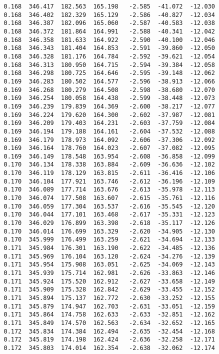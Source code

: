 \begin{verbatim}
   0.168  346.417  182.563  165.198   -2.585  -41.072  -12.030
   0.168  346.402  182.329  165.129   -2.586  -40.827  -12.034
   0.168  346.387  182.096  165.060   -2.587  -40.583  -12.038
   0.168  346.372  181.864  164.991   -2.588  -40.341  -12.042
   0.168  346.358  181.633  164.922   -2.590  -40.100  -12.046
   0.168  346.343  181.404  164.853   -2.591  -39.860  -12.050
   0.168  346.328  181.176  164.784   -2.592  -39.621  -12.054
   0.168  346.313  180.950  164.715   -2.594  -39.384  -12.058
   0.168  346.298  180.725  164.646   -2.595  -39.148  -12.062
   0.169  346.283  180.502  164.577   -2.596  -38.913  -12.066
   0.169  346.268  180.279  164.508   -2.598  -38.680  -12.070
   0.169  346.254  180.058  164.438   -2.599  -38.448  -12.073
   0.169  346.239  179.839  164.369   -2.600  -38.217  -12.077
   0.169  346.224  179.620  164.300   -2.602  -37.987  -12.081
   0.169  346.209  179.403  164.231   -2.603  -37.759  -12.084
   0.169  346.194  179.188  164.161   -2.604  -37.532  -12.088
   0.169  346.179  178.973  164.092   -2.606  -37.306  -12.092
   0.169  346.164  178.760  164.023   -2.607  -37.082  -12.095
   0.169  346.149  178.548  163.954   -2.608  -36.858  -12.099
   0.170  346.134  178.338  163.884   -2.609  -36.636  -12.102
   0.170  346.119  178.129  163.815   -2.611  -36.416  -12.106
   0.170  346.104  177.921  163.746   -2.612  -36.196  -12.109
   0.170  346.089  177.714  163.676   -2.613  -35.978  -12.113
   0.170  346.074  177.508  163.607   -2.615  -35.761  -12.116
   0.170  346.059  177.304  163.537   -2.616  -35.545  -12.120
   0.170  346.044  177.101  163.468   -2.617  -35.331  -12.123
   0.170  346.029  176.899  163.398   -2.618  -35.117  -12.126
   0.170  346.014  176.699  163.329   -2.620  -34.905  -12.130
   0.170  345.999  176.499  163.259   -2.621  -34.694  -12.133
   0.171  345.984  176.301  163.190   -2.622  -34.485  -12.136
   0.171  345.969  176.104  163.120   -2.624  -34.276  -12.139
   0.171  345.954  175.908  163.051   -2.625  -34.069  -12.143
   0.171  345.939  175.714  162.981   -2.626  -33.863  -12.146
   0.171  345.924  175.520  162.912   -2.627  -33.658  -12.149
   0.171  345.909  175.328  162.842   -2.629  -33.455  -12.152
   0.171  345.894  175.137  162.772   -2.630  -33.252  -12.155
   0.171  345.879  174.947  162.703   -2.631  -33.051  -12.159
   0.171  345.864  174.758  162.633   -2.633  -32.851  -12.162
   0.171  345.849  174.570  162.563   -2.634  -32.652  -12.165
   0.172  345.834  174.384  162.494   -2.635  -32.454  -12.168
   0.172  345.819  174.198  162.424   -2.636  -32.258  -12.171
   0.172  345.803  174.014  162.354   -2.638  -32.062  -12.174

\end{verbatim}
